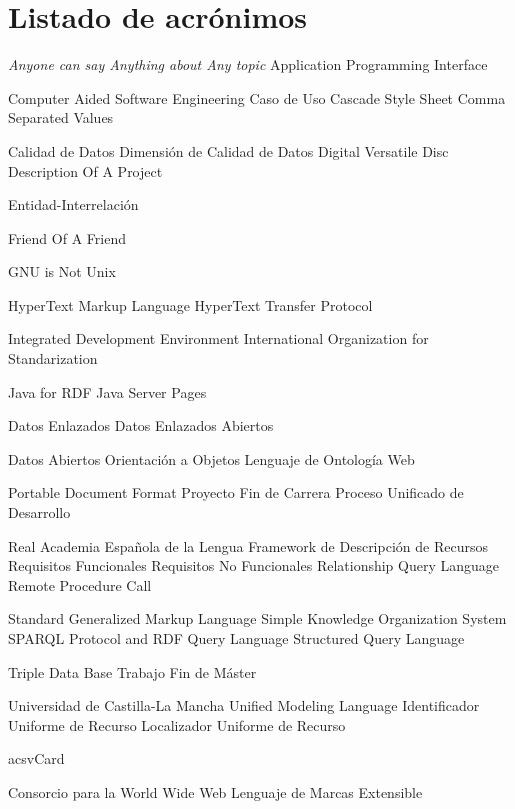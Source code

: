 \chapter{Listado de acrónimos}
{\small
\begin{acronym}[XXXXXXXX]
       {\textit{Anyone can say Anything about Any topic}}
       {Application Programming Interface}

      {Computer Aided Software Engineering}
       {Caso de Uso}
       {Cascade Style Sheet}
       {Comma Separated Values}

        {Calidad de Datos}
       {Dimensión de Calidad de Datos}
       {Digital Versatile Disc}
      {Description Of A Project}

        {Entidad-Interrelación}

      {Friend Of A Friend}

       {\acs{GNU} is Not Unix}

      {HyperText Markup Language}
      {HyperText Transfer Protocol}

       {Integrated Development Environment}
       {International Organization for Standarization}

      {Java for \acs{RDF}}
       {Java Server Pages}

        {Datos Enlazados}
       {Datos Enlazados Abiertos}

        {Datos Abiertos}
        {Orientación a Objetos}
       {Lenguaje de Ontología Web}

       {Portable Document Format}
       {Proyecto Fin de Carrera}
       {Proceso Unificado de Desarrollo}

       {Real Academia Española de la Lengua}
       {Framework de Descripción de Recursos}
        {Requisitos Funcionales}
       {Requisitos No Funcionales}
       {Relationship Query Language}
       {Remote Procedure Call}

      {Standard Generalized Markup Language}
      {Simple Knowledge Organization System}
    {\acs{SPARQL} Protocol and RDF Query Language}
       {Structured Query Language}

       {Triple Data Base}
       {Trabajo Fin de Máster}

      {Universidad de Castilla-La Mancha}
       {Unified Modeling Language}
       {Identificador Uniforme de Recurso}
       {Localizador Uniforme de Recurso}

     {acs{vCard}}

       {Consorcio para la World Wide Web}
       {Lenguaje de Marcas Extensible}

\end{acronym}
}


